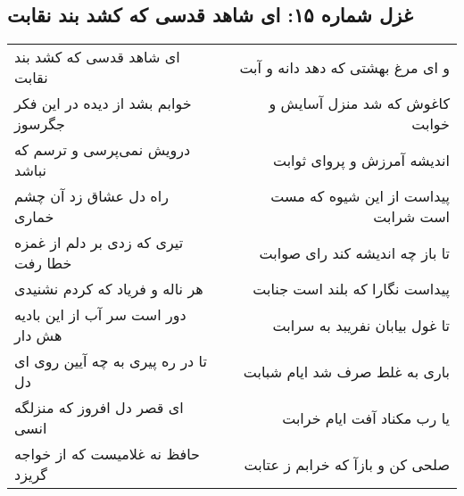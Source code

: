 \begin{center}
\section*{غزل شماره ۱۵: ای شاهد قدسی که کشد بند نقابت}
\label{sec:sh015}
\begin{longtable}{l p{0.5cm} r}
ای شاهد قدسی که کشد بند نقابت
&&
و ای مرغ بهشتی که دهد دانه و آبت
\\
خوابم بشد از دیده در این فکر جگرسوز
&&
کاغوش که شد منزل آسایش و خوابت
\\
درویش نمی‌پرسی و ترسم که نباشد
&&
اندیشه آمرزش و پروای ثوابت
\\
راه دل عشاق زد آن چشم خماری
&&
پیداست از این شیوه که مست است شرابت
\\
تیری که زدی بر دلم از غمزه خطا رفت
&&
تا باز چه اندیشه کند رای صوابت
\\
هر ناله و فریاد که کردم نشنیدی
&&
پیداست نگارا که بلند است جنابت
\\
دور است سر آب از این بادیه هش دار
&&
تا غول بیابان نفریبد به سرابت
\\
تا در ره پیری به چه آیین روی ای دل
&&
باری به غلط صرف شد ایام شبابت
\\
ای قصر دل افروز که منزلگه انسی
&&
یا رب مکناد آفت ایام خرابت
\\
حافظ نه غلامیست که از خواجه گریزد
&&
صلحی کن و بازآ که خرابم ز عتابت
\\
\end{longtable}
\end{center}
